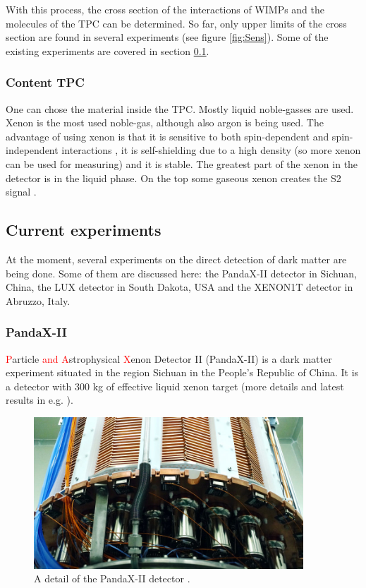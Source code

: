 \documentclass{article}
\begin{document}
With this process, the cross section of the interactions of WIMPs and the molecules of the TPC can be determined. So far, only upper limits of the cross section are found in several experiments (see figure \ref{fig:Sens}).
Some of the existing experiments are covered in section \ref{sec:current_exp}.
\subsubsection{Content TPC}
One can chose the material inside the TPC. Mostly liquid noble-gasses are used. Xenon is the most used noble-gas, although also argon is being used. The advantage of using xenon is that it is sensitive to both spin-dependent and spin-independent interactions \cite{Aprile:2013doa}, it is self-shielding due to a high density (so more xenon can be used for measuring) \cite{Undagoitia:2015gya} and it is stable. The greatest part of the xenon in the detector is in the liquid phase. On the top some gaseous xenon creates the S2 signal \cite{Aprile:2009dv}.

\subsection{Current experiments}
\label{sec:current_exp}
At the moment, several experiments on the direct detection of dark matter are being done. Some of them are discussed here: the PandaX-II detector in Sichuan, China, the LUX detector in South Dakota, USA and the XENON1T detector in Abruzzo, Italy.

\subsubsection{PandaX-II}
\label{sec:PandaX}\textcolor{red}{P}article \textcolor{red}{and A}strophysical \textcolor{red}{X}enon Detector II (PandaX-II) is a dark matter experiment situated in the region Sichuan in the People's Republic of China. It is a detector with 300 kg of effective liquid xenon target \cite{Liu2015} (more details and latest results in e.g. \cite{Cui:2017nnn}).\\

\begin{figure}[h]
    \centering
    \includegraphics[width=0.9\textwidth]{pandax.jpg}
    \caption{A detail of the PandaX-II detector \cite{SJTU}.}
    \label{fig:PandaX}
\end{figure}
\end{document}
